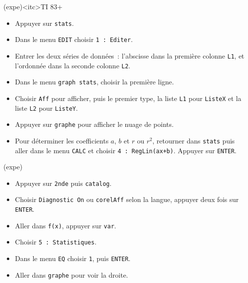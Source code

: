 \documentclass[a4paper, 12pt, garamond]{book}
\begin{document}
\begin{tcn}[breakable](expe)<itc>{TI 83+}
	\begin{itemize}
		\item Appuyer sur \texttt{stats}.
		\item Dans le menu \texttt{EDIT} choisir \texttt{1~: Editer}.
		\item Entrer les deux séries de données~: l'abscisse dans la première colonne
		      \texttt{L1}, et l'ordonnée dans la seconde colonne \texttt{L2}.
		\item Dans le menu \texttt{graph stats}, choisir la première ligne.
		\item Choisir \texttt{Aff} pour afficher, puis le premier type, la liste
		      \texttt{L1} pour \texttt{ListeX} et la liste \texttt{L2} pour
		      \texttt{ListeY}.
		\item Appuyer sur \texttt{graphe} pour afficher le nuage de points.
		\item Pour déterminer les coefficients $a$, $b$ et $r$ ou $r^{2}$,
		      retourner dans \texttt{stats} puis aller dans le menu \texttt{CALC} et
		      choisir \texttt{4~: RegLin(ax+b)}. Appuyer sur \texttt{ENTER}.
	\end{itemize}
	\begin{isd}(expe)
		\begin{itemize}
			\item Appuyer sur \texttt{2nde} puis \texttt{catalog}.
			\item Choisir \texttt{Diagnostic On} ou \texttt{corelAff} selon la langue,
			      appuyer deux fois sur \texttt{ENTER}.
		\end{itemize}
		\tcblower
		\begin{itemize}
			\item Aller dans \texttt{f(x)}, appuyer sur \texttt{var}.
			\item Choisir \texttt{5~: Statistiques}.
			\item Dans le menu \texttt{EQ} choisir \texttt{1}, puis \texttt{ENTER}.
			\item Aller dans \texttt{graphe} pour voir la droite.
		\end{itemize}
	\end{isd}
\end{tcn}
\end{document}

